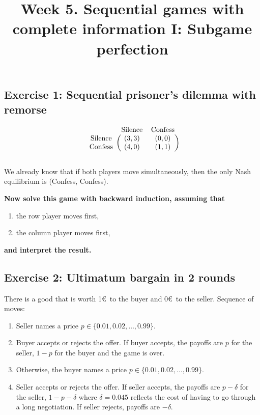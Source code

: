 \documentclass[10pt]{article}
\title{\textbf{Week 5.} Sequential games with complete information I: Subgame perfection}
\date{}
\begin{document}
\maketitle


\subsection*{Exercise 1: Sequential prisoner's dilemma with remorse}

\begin{equation*}
    \begin{blockarray}{ccc}
        & \text{Silence} & \text{Confess} \\
        \begin{block}{c(cc)}
            \text{Silence} & (3, 3) & (0, 0) \\
            \text{Confess} & (4, 0) & (1, 1) \\
        \end{block}
    \end{blockarray}
\end{equation*}

We already know that if both players move simultaneously, then the only Nash
equilibrium is (Confess, Confess).

\textbf{Now solve this game with backward induction, assuming that}

\begin{enumerate}
    \item the row player moves first,
    \item the column player moves first,
\end{enumerate}

\textbf{and interpret the result.}

\subsection*{Exercise 2: Ultimatum bargain in 2 rounds}

There is a good that is worth 1\euro~to the buyer and 0\euro~to the seller.
Sequence of moves:

\begin{enumerate}
    \item Seller names a price \(p \in \{0.01, 0.02, \dots, 0.99\}\).
    \item Buyer accepts or rejects the offer. If buyer accepts, the payoffs are
    \(p\) for the seller, \(1 - p\) for the buyer and the game is over.
    \item Otherwise, the buyer names a price \(p \in \{0.01, 0.02, \dots, 0.99\}\).
    \item Seller accepts or rejects the offer. If seller accepts, the payoffs are
    \(p - \delta\) for the seller, \(1 - p - \delta\) where \(\delta=0.045\) reflects
    the cost of having to go through a long negotiation. If seller rejects, payoffs
    are \(-\delta\).
\end{enumerate}
\end{document}
